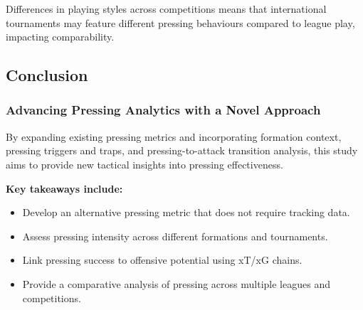 \documentclass[12pt]{article}
\begin{document}
Differences in playing styles across competitions means that international tournaments may feature different pressing behaviours compared to league play, impacting comparability.

\subsection{Conclusion}

\subsubsection{Advancing Pressing Analytics with a Novel Approach}

By expanding existing pressing metrics and incorporating formation context, pressing triggers and traps, and pressing-to-attack transition analysis, this study aims to provide new tactical insights into pressing effectiveness.

\textbf{Key takeaways include:}
\begin{itemize}
    \item Develop an alternative pressing metric that does not require tracking data.
    \item Assess pressing intensity across different formations and tournaments.
    \item Link pressing success to offensive potential using xT/xG chains.
    \item Provide a comparative analysis of pressing across multiple leagues and competitions.
\end{itemize}



\end{document}
